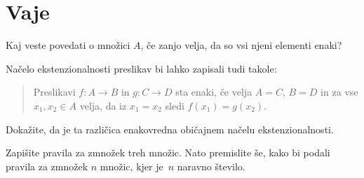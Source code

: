 \section{Vaje}

\begin{vaja}
  Kaj veste povedati o množici $A$, če zanjo velja, da so vsi njeni elementi enaki?
\end{vaja}

\begin{vaja}
  Načelo ekstenzionalnosti preslikav bi lahko zapisali tudi takole:
  \begin{quote}
    Preslikavi $f : A \to B$ in $g : C \to D$ sta enaki, če velja $A = C$, $B = D$ in za
    vse $x_1, x_2 \in A$ velja, da iz $x_1 = x_2$ sledi $f(x_1) = g(x_2)$.
  \end{quote}
  Dokažite, da je ta različica enakovredna običajnem načelu ekstenzionalnosti.
\end{vaja}

\begin{vaja}
  Zapišite pravila za zmnožek treh množic. Nato premislite še, kako bi podali pravila za
  zmnožek $n$ množic, kjer je~$n$ naravno število.
\end{vaja}



